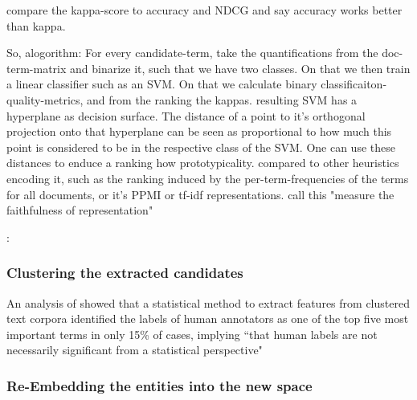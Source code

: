 \textcite{Ager2018} compare the kappa-score to accuracy and NDCG and say accuracy works better than kappa.

So, alogorithm: For every candidate-term, take the quantifications from the doc-term-matrix and binarize it, such that we have two classes. On that we then train a linear classifier such as an SVM. On that we calculate binary classificaiton-quality-metrics, and from the ranking the kappas. resulting SVM has a hyperplane as decision surface. The distance of a point to it's orthogonal projection onto that hyperplane can be seen as proportional to how much this point is considered to be in the respective class of the SVM. One can use these distances to enduce a ranking how prototypicality. compared to other heuristics encoding it, such as the ranking induced by the per-term-frequencies of the terms for all documents, or it's PPMI or tf-idf representations.
\cite{Derrac2015} call this "measure the faithfulness of representation"

\cite{Ager2018}: 



\subsubsection{Clustering the extracted candidates}
\label{sec:algo:cluster}

An analysis of \cite{Carmel2009} showed that a statistical method to extract features from clustered text corpora identified the labels of human annotators as one of the top five most important terms in only 15\% of cases, implying ``that human labels are not necessarily significant from a statistical perspective" \cite[139]{Carmel2009}


\subsubsection{Re-Embedding the entities into the new space}

